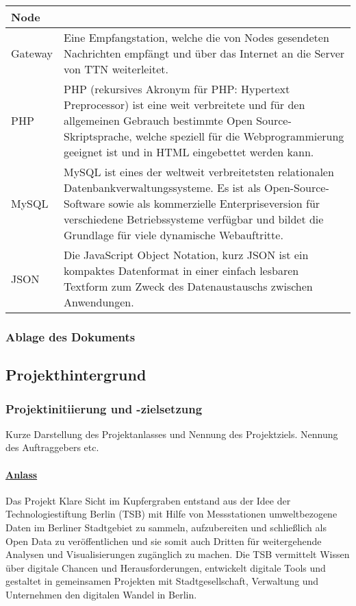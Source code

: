 \documentclass[
11pt,
a4paper,
ngerman,
]{article}
\begin{document}
\begin{table}[H]
\begin{tabularx}{\textwidth}{ |l|X| }
		\hline
		Node &  \\
		\hline
		Gateway & Eine Empfangstation, welche die von Nodes gesendeten Nachrichten empfängt und über das Internet an die Server von TTN weiterleitet. \\
		\hline
		PHP & PHP (rekursives Akronym für PHP: Hypertext Preprocessor) ist eine weit
			  verbreitete und für den allgemeinen Gebrauch bestimmte
			  Open Source-Skriptsprache, welche speziell für die Webprogrammierung
			  geeignet ist und in HTML eingebettet werden kann. \\
		\hline
		MySQL & MySQL ist eines der weltweit verbreitetsten relationalen
				Datenbankverwaltungssysteme. Es ist als Open-Source-Software sowie
				als kommerzielle Enterpriseversion für verschiedene Betriebssysteme
				verfügbar und bildet die Grundlage für viele dynamische Webauftritte. \\
		\hline
		JSON & Die JavaScript Object Notation, kurz JSON ist ein kompaktes Datenformat
			   in einer einfach lesbaren Textform zum Zweck des Datenaustauschs zwischen
			   Anwendungen. \\
		\hline
	\end{tabularx}
\end{table}

\subsubsection{Ablage des Dokuments}

\subsection{Projekthintergrund}

\subsubsection{Projektinitiierung und -zielsetzung}

\begin{itshape}
	Kurze Darstellung des Projektanlasses und Nennung des Projektziels.
	Nennung des Auftraggebers etc.
\end{itshape}

\paragraph{\uline{Anlass}}
Das Projekt \glqq Klare Sicht im Kupfergraben\grqq{} entstand aus der Idee der Technologiestiftung Berlin (TSB) mit Hilfe von Messstationen umweltbezogene Daten im Berliner Stadtgebiet zu sammeln, aufzubereiten und schließlich als \glqq Open Data\grqq{} zu veröffentlichen und sie somit auch Dritten für weitergehende Analysen und Visualisierungen zugänglich zu machen.
Die TSB vermittelt Wissen über digitale Chancen und Herausforderungen, entwickelt digitale Tools und gestaltet in gemeinsamen Projekten mit Stadtgesellschaft, Verwaltung und Unternehmen den digitalen Wandel in Berlin.
\end{document}
